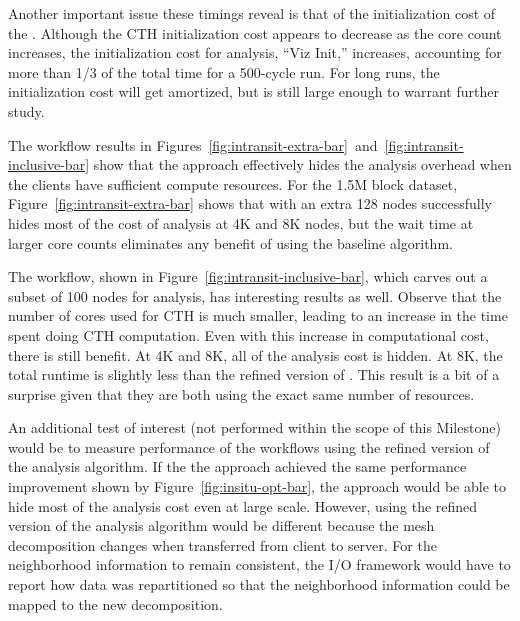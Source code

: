Another important issue these timings reveal is that of the initialization
cost of the \vda.  Although the CTH initialization cost appears to decrease
as the core count increases, the initialization cost for analysis, ``Viz
Init,'' increases, accounting for more than 1/3 of the total time for a
500-cycle run.  For long runs, the initialization cost will get amortized,
but is still large enough to warrant further study.

The \intransit workflow results in
Figures~\ref{fig:intransit-extra-bar}~and~\ref{fig:intransit-inclusive-bar}
show that the \intransit approach effectively hides the analysis overhead
when the clients have sufficient compute resources.  For the 1.5M block
dataset, Figure~\ref{fig:intransit-extra-bar} shows that \intransit with an
extra 128 nodes successfully hides most of the cost of analysis at 4K and 8K
nodes, but the wait time at larger core counts eliminates any benefit of
\intransit using the baseline algorithm.

The \intransit workflow, shown in Figure~\ref{fig:intransit-inclusive-bar},
which carves out a subset of 100 nodes for analysis, has interesting
results as well.  Observe that the number of cores used for CTH is much
smaller, leading to an increase in the time spent doing CTH computation.
Even with this increase in computational cost, there is still benefit.  At
4K and 8K, all of the analysis cost is hidden.  At 8K, the total runtime is
slightly less than the refined version of \insitu.  This result is a bit
of a surprise given that they are both using the exact same number of
resources.


An additional test of interest (not performed within the scope of this Milestone) would be to measure
performance of the \intransit workflows using the refined version of
the analysis algorithm.  If the the \intransit approach achieved the same
performance improvement shown by Figure~\ref{fig:insitu-opt-bar}, the
\intransit approach would be able to hide most of the analysis cost even at
large scale.  However, using the refined version of the analysis algorithm
would be different because the mesh decomposition changes when transferred
from client to server.  For the neighborhood information to remain
consistent, the I/O framework would have to report how data was
repartitioned so that the neighborhood information could be mapped to the
new decomposition.

